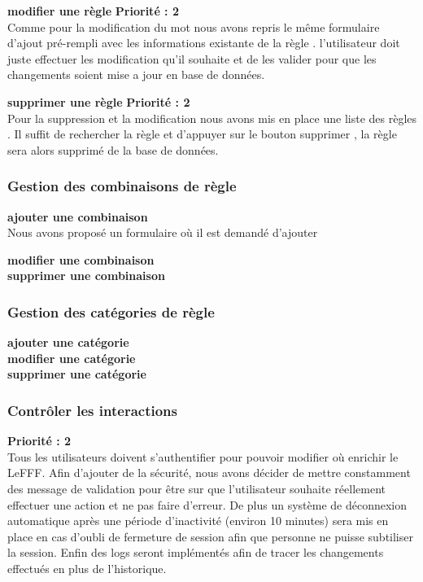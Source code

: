 \documentclass[12pt,a4paper]{article}
\begin{document}
\textbf{modifier une règle } \textbf{Priorité : 2} \\ Comme pour la modification du mot nous avons repris le même formulaire d'ajout pré-rempli avec les informations existante de la règle . l'utilisateur doit juste effectuer les modification qu'il souhaite et de les valider pour que les changements soient mise a jour  en base de données.


\textbf{supprimer une règle } \textbf{Priorité : 2} \\ Pour la suppression et la modification nous avons mis en place une liste des règles . Il suffit de rechercher la règle et d'appuyer sur le bouton supprimer , la règle  sera alors supprimé de la base de données.

\subsubsection{Gestion des combinaisons de règle }
\textbf{ajouter une combinaison } \\ Nous avons proposé un formulaire où il est demandé d'ajouter


\textbf{modifier une combinaison } \\


\textbf{supprimer une combinaison } \\


\subsubsection{Gestion des catégories de règle }
\textbf{ajouter une catégorie } \\


\textbf{modifier une catégorie } \\


\textbf{supprimer une catégorie }\\


\subsubsection{Contrôler les interactions }
 \textbf{Priorité : 2}
\\ Tous les utilisateurs doivent s'authentifier pour pouvoir modifier où enrichir le LeFFF. Afin d'ajouter de la sécurité, nous avons décider de mettre constamment des message de validation pour être sur que l'utilisateur souhaite réellement effectuer une action et ne pas faire d'erreur.
De plus un système de déconnexion automatique après une période d'inactivité (environ 10 minutes) sera mis en place en cas d'oubli de fermeture de session afin que personne ne puisse subtiliser la session.
Enfin des logs seront implémentés afin de tracer les changements effectués en plus de l'historique.
\end{document}

